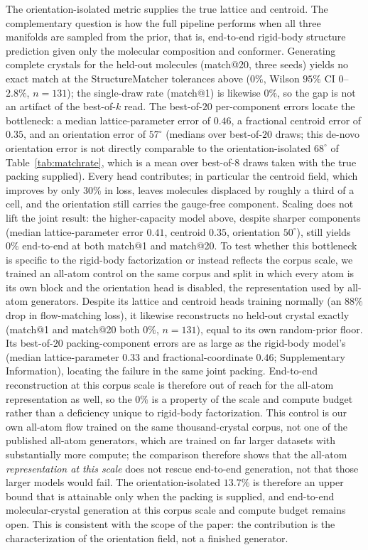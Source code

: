 \documentclass[11pt]{article}
\begin{document}
The orientation-isolated metric supplies the true lattice and centroid. The
complementary question is how the full pipeline performs when all three manifolds
are sampled from the prior, that is, end-to-end rigid-body structure prediction
given only the molecular composition and conformer. Generating complete crystals
for the held-out molecules (match@20, three seeds) yields no exact match at the
StructureMatcher tolerances above ($0\%$, Wilson $95\%$ CI $0$--$2.8\%$,
$n=131$); the single-draw rate (match@1) is likewise $0\%$, so the gap is not an
artifact of the best-of-$k$ read. The best-of-$20$ per-component errors locate the
bottleneck: a median lattice-parameter error of $0.46$, a fractional centroid
error of $0.35$, and an orientation error of $57^\circ$ (medians over best-of-$20$
draws; this de-novo orientation error is not directly comparable to the
orientation-isolated $68^\circ$ of Table~\ref{tab:matchrate}, which is a mean over
best-of-$8$ draws taken with the true packing supplied). Every head contributes; in particular the
centroid field, which improves by only $30\%$ in loss, leaves molecules displaced
by roughly a third of a cell, and the orientation still carries the gauge-free
component. Scaling does not lift the joint result: the higher-capacity model
above, despite sharper components (median lattice-parameter error $0.41$,
centroid $0.35$, orientation $50^\circ$), still yields $0\%$ end-to-end at both
match@1 and match@20. To test whether this bottleneck is specific to the
rigid-body factorization or instead reflects the corpus scale, we trained an
all-atom control on the same corpus and split in which every atom is its own
block and the orientation head is disabled, the representation used by all-atom
generators\cite{jin2025oxtal,subramanian2026packflow}. Despite its lattice and
centroid heads training normally (an $88\%$ drop in flow-matching loss), it
likewise reconstructs no held-out crystal exactly (match@1 and match@20 both
$0\%$, $n=131$), equal to its own random-prior floor. Its best-of-$20$
packing-component errors are as large as the rigid-body model's (median
lattice-parameter $0.33$ and fractional-coordinate $0.46$; Supplementary
Information), locating the failure in the same joint packing. End-to-end reconstruction
at this corpus scale is therefore out of reach for the all-atom representation as
well, so the $0\%$ is a property of the scale and compute budget rather than a
deficiency unique to rigid-body factorization. This control is our own all-atom
flow trained on the same thousand-crystal corpus, not one of the published
all-atom generators\cite{jin2025oxtal,subramanian2026packflow}, which are trained
on far larger datasets with substantially more compute; the comparison therefore
shows that the all-atom \emph{representation at this scale} does not rescue
end-to-end generation, not that those larger models would fail. The
orientation-isolated $13.7\%$ is therefore an upper bound that is attainable only
when the packing is supplied, and end-to-end molecular-crystal generation at this
corpus scale and compute budget remains open. This is consistent with the scope
of the paper: the contribution is the characterization of the orientation field,
not a finished generator.
\end{document}
